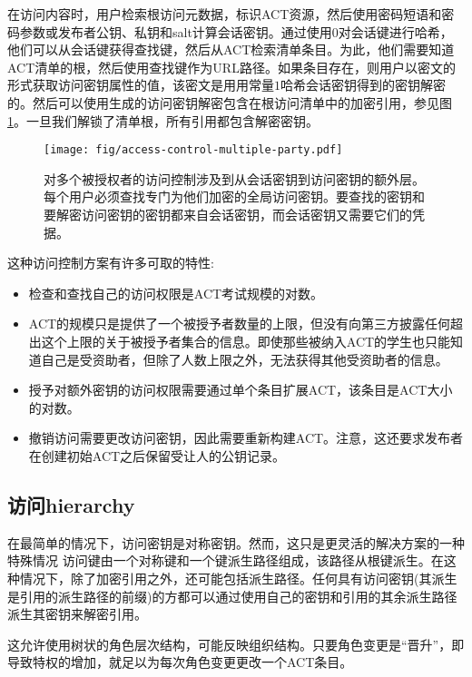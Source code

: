 在访问内容时，用户检索根访问元数据，标识ACT资源，然后使用密码短语和密码参数或发布者公钥、私钥和salt计算会话密钥。通过使用$0$对会话键进行哈希，他们可以从会话键获得查找键，然后从ACT检索清单条目。为此，他们需要知道ACT清单的根，然后使用查找键作为URL路径。如果条目存在，则用户以密文的形式获取访问密钥属性的值，该密文是用用常量$1$哈希会话密钥得到的密钥解密的。然后可以使用生成的访问密钥解密包含在根访问清单中的加密引用，参见图\ref{fig:access-control-multiple-party}。一旦我们解锁了清单根，所有引用都包含解密密钥。

\begin{figure}[htbp]
\centering
\texttt{[image: fig/access-control-multiple-party.pdf]}
\caption[对多个被授权的访问控制\statusyellow]{对多个被授权者的访问控制涉及到从会话密钥到访问密钥的额外层。每个用户必须查找专门为他们加密的全局访问密钥。要查找的密钥和要解密访问密钥的密钥都来自会话密钥，而会话密钥又需要它们的凭据。} 
\label{fig:access-control-multiple-party}
\end{figure}


这种访问控制方案有许多可取的特性:
\begin{itemize}
\item 检查和查找自己的访问权限是ACT考试规模的对数。
\item ACT的规模只是提供了一个被授予者数量的上限，但没有向第三方披露任何超出这个上限的关于被授予者集合的信息。即使那些被纳入ACT的学生也只能知道自己是受资助者，但除了人数上限之外，无法获得其他受资助者的信息。
\item 授予对额外密钥的访问权限需要通过单个条目扩展ACT，该条目是ACT大小的对数。 
\item 撤销访问需要更改访问密钥，因此需要重新构建ACT。注意，这还要求发布者在创建初始ACT之后保留受让人的公钥记录。
\end{itemize}

\subsection{访问hierarchy\statusgreen}

在最简单的情况下，访问密钥是对称密钥。然而，这只是更灵活的解决方案的一种特殊情况
访问键由一个对称键和一个键派生路径组成，该路径从根键派生。在这种情况下，除了加密引用之外，还可能包括派生路径。任何具有访问密钥(其派生是引用的派生路径的前缀)的方都可以通过使用自己的密钥和引用的其余派生路径派生其密钥来解密引用。

这允许使用树状的角色层次结构，可能反映组织结构。只要角色变更是“晋升”，即导致特权的增加，就足以为每次角色变更更改一个ACT条目。

